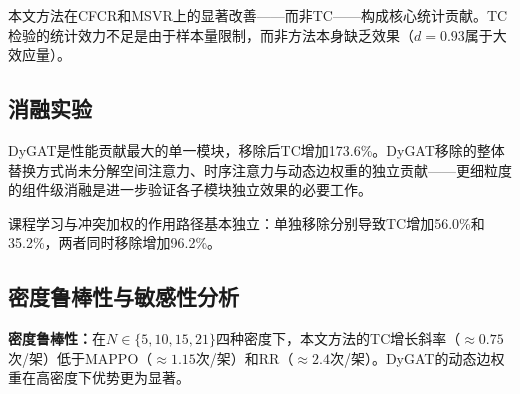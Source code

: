 \documentclass[12pt,a4paper,UTF8]{ctexart}
\begin{document}
本文方法在CFCR和MSVR上的显著改善——而非TC——构成核心统计贡献。TC检验的统计效力不足是由于样本量限制，而非方法本身缺乏效果（$d=0.93$属于大效应量）。

\subsection{消融实验}

\begin{table}[H]
    \centering
    \caption{消融实验结果（21架eVTOL，$n=5$）}
    \label{tab:ablation}
\end{table}

DyGAT是性能贡献最大的单一模块，移除后TC增加173.6\%。DyGAT移除的整体替换方式尚未分解空间注意力、时序注意力与动态边权重的独立贡献——更细粒度的组件级消融是进一步验证各子模块独立效果的必要工作。

课程学习与冲突加权的作用路径基本独立：单独移除分别导致TC增加56.0\%和35.2\%，两者同时移除增加96.2\%。

\subsection{密度鲁棒性与敏感性分析}

\textbf{密度鲁棒性：}在$N \in \{5, 10, 15, 21\}$四种密度下，本文方法的TC增长斜率（$\approx0.75$次/架）低于MAPPO（$\approx1.15$次/架）和RR（$\approx2.4$次/架）。DyGAT的动态边权重在高密度下优势更为显著。
\end{document}
